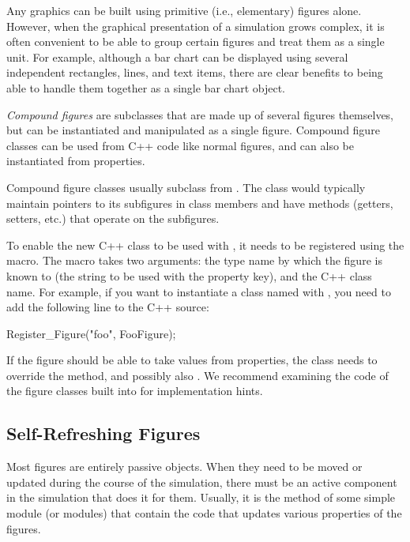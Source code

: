 Any graphics can be built using primitive (i.e., elementary) figures
alone. However, when the graphical presentation of a simulation
grows complex, it is often convenient to be able to group certain
figures and treat them as a single unit. For example, although
a bar chart can be displayed using several independent rectangles,
lines, and text items, there are clear benefits to being able to
handle them together as a single bar chart object.

\textit{Compound figures} are  subclasses that
are made up of several figures themselves, but can be instantiated
and manipulated as a single figure. Compound figure classes
can be used from C++ code like normal figures, and can also
be instantiated from  properties.

Compound figure classes usually subclass from .
The class would typically maintain pointers to its subfigures in
class members and have methods (getters, setters, etc.) that operate
on the subfigures.

To enable the new C++ class to be used with ,
it needs to be registered using the  macro.
The macro takes two arguments: the type name by which the figure
is known to  (the string to be used with the  property key),
and the C++ class name. For example, if you want to instantiate
a class named  with ,
you need to add the following line to the C++ source:

\begin{cpp}
Register_Figure("foo", FooFigure);
\end{cpp}

If the figure should be able to take values from  properties,
the class needs to override the  method,
and possibly also . We recommend
examining the code of the figure classes built into {\opp} for
implementation hints.



\subsection{Self-Refreshing Figures}
\label{sec:graphics:self-refreshing-figures}

Most figures are entirely passive objects. When they need to be moved
or updated during the course of the simulation, there must be an
active component in the simulation that does it for them. Usually, it is the
 method of some simple module (or modules) that
contain the code that updates various properties of the figures.

